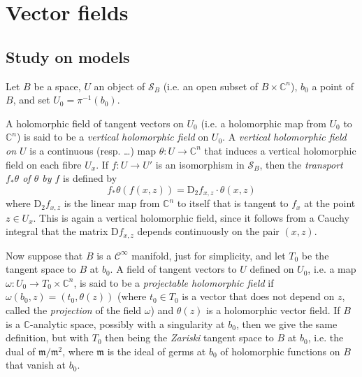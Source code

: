 \documentclass{article}
\theoremstyle{plain}
\theoremstyle{definition}
\newcommand{\CC}{\mathbb{C}}
\newcommand{\DD}{\mathrm{D}}
\newcommand{\oldpage}[1]{\marginpar{\footnotesize$\Big\vert$ \textit{p.~#1}}}
\begin{document}
\section{Vector fields}
\label{III}

\subsection{Study on models}
\label{III.1}

Let $B$ be a space, $U$ an object of $\mathscr{S}_B$ (i.e. an open subset of $B\times\CC^n$), $b_0$ a point of $B$, and set $U_0=\pi^{-1}(b_0)$.

A holomorphic field of tangent vectors on $U_0$ (i.e. a holomorphic map from $U_0$ to $\CC^n$) is said to be a \emph{vertical holomorphic field} on $U_0$.
A \emph{vertical holomorphic field on $U$} is a continuous (resp. \ldots) map $\theta\colon U\to\CC^n$ that induces a vertical holomorphic field on each fibre $U_x$.
If $f\colon U\to U'$ is an isomorphism in $\mathscr{S}_B$, then the \emph{transport $f_*\theta$ of $\theta$ by $f$} is defined by
\[
  f_*\theta(f(x,z)) = \DD_2 f_{x,z}\cdot\theta(x,z)
\]
where $\DD_2 f_{x,z}$ is the linear map from $\CC^n$ to itself that is tangent to $f_x$ at the point $z\in U_x$.
This is again a vertical holomorphic field, since it follows from a Cauchy integral that the matrix $\DD f_{x,z}$ depends continuously on the pair $(x,z)$.

Now suppose that $B$ is a $\mathscr{C}^\infty$ manifold, just for simplicity, and let $T_0$ be the tangent space to $B$ at $b_0$.
A field of tangent vectors to $U$ defined on $U_0$,
\oldpage{2-05}
i.e. a map $\omega\colon U_0\to T_0\times\CC^n$, is said to be a \emph{projectable holomorphic field} if $\omega(b_0,z)=(t_0,\theta(z))$ (where $t_0\in T_0$ is a vector that does not depend on $z$, called the \emph{projection} of the field $\omega$) and $\theta(z)$ is a holomorphic vector field.
If $B$ is a $\CC$-analytic space, possibly with a singularity at $b_0$, then we give the same definition, but with $T_0$ then being the \emph{Zariski} tangent space to $B$ at $b_0$, i.e. the dual of $\mathfrak{m}/\mathfrak{m}^2$, where $\mathfrak{m}$ is the ideal of germs at $b_0$ of holomorphic functions on $B$ that vanish at $b_0$.
\end{document}

